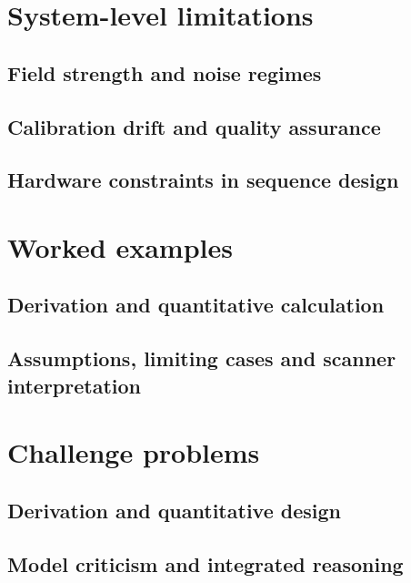 \section{System-level limitations}
\label{sec:17:system-level-limitations}
\subsection{Field strength and noise regimes}
\subsection{Calibration drift and quality assurance}
\subsection{Hardware constraints in sequence design}

\section{Worked examples}
\label{sec:17:worked-examples}
\subsection{Derivation and quantitative calculation}
\subsection{Assumptions, limiting cases and scanner interpretation}

\section{Challenge problems}
\label{sec:17:challenge-problems}
\subsection{Derivation and quantitative design}
\subsection{Model criticism and integrated reasoning}
